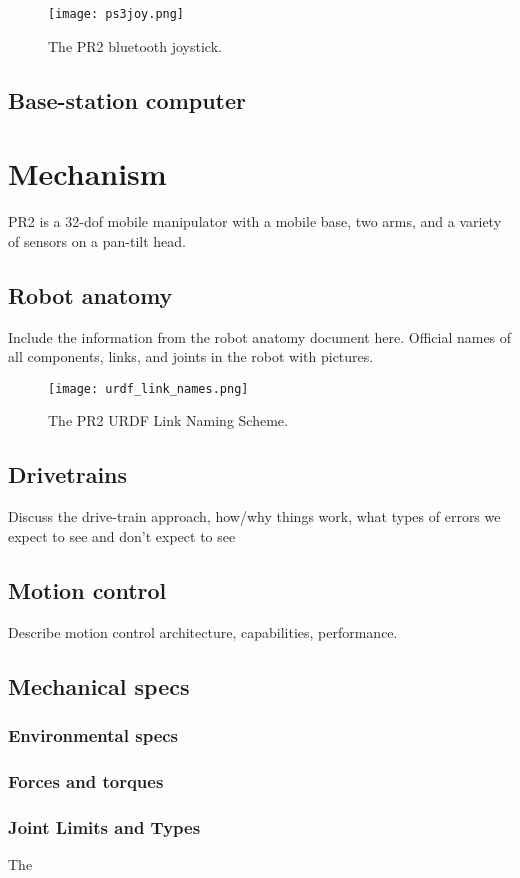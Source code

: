 \begin{figure}[h]
\centering
\texttt{[image: ps3joy.png]}
\caption{The PR2 bluetooth joystick.}
\label{fig:ps3joy}
\end{figure}

\subsection{Base-station computer}
\section{Mechanism}
PR2 is a 32-dof mobile manipulator with a mobile base, two arms, and a variety of sensors on a pan-tilt head.
\subsection{Robot anatomy}
Include the information from the robot anatomy document here.  Official names of all components, links, and 
joints in the robot with pictures.

\begin{figure}[h]
\centering
\texttt{[image: urdf\_link\_names.png]}
\caption{The PR2 URDF Link Naming Scheme.}
\label{fig:urdf_link_names}
\end{figure}

\subsection{Drivetrains}
Discuss the drive-train approach, how/why things work, what types of errors we expect to see and don't expect to see
\subsection{Motion control}
Describe motion control architecture, capabilities, performance.
\subsection{Mechanical specs}
\subsubsection{Environmental specs}
\subsubsection{Forces and torques}
\subsubsection{Joint Limits and Types}
The 

